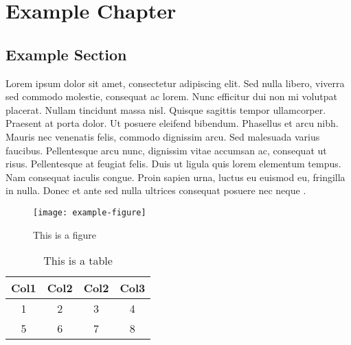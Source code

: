 \chapter{Example Chapter}
\label{chapter:example-chapter}
\section{Example Section}
\label{section:example-section}
Lorem ipsum dolor sit amet, consectetur adipiscing elit. Sed nulla libero, viverra sed commodo molestie, consequat ac lorem. Nunc efficitur dui non mi volutpat placerat. Nullam tincidunt massa nisl. Quisque sagittis tempor ullamcorper. Praesent at porta dolor. Ut posuere eleifend bibendum. Phasellus et arcu nibh. Mauris nec venenatis felis, commodo dignissim arcu. Sed malesuada varius faucibus. Pellentesque arcu nunc, dignissim vitae accumsan ac, consequat ut risus. Pellentesque at feugiat felis. Duis ut ligula quis lorem elementum tempus. Nam consequat iaculis congue. Proin sapien urna, luctus eu euismod eu, fringilla in nulla. Donec et ante sed nulla ultrices consequat posuere nec neque \cite{lamport1994latex}.

\begin{figure}[h]
    \centering
    \texttt{[image: example-figure]}
    \caption{This is a figure}
    \label{figure:example-figure}
\end{figure}

\begin{table}[h!]
    \centering
    \begin{tabular}{|c c c c|} 
        \hline
        Col1 & Col2 & Col2 & Col3 \\
        \hline\hline
        1 & 2 & 3 & 4 \\
        5 & 6 & 7 & 8 \\
        \hline
    \end{tabular}
    \caption{This is a table}
    \label{table:example-table}
\end{table}